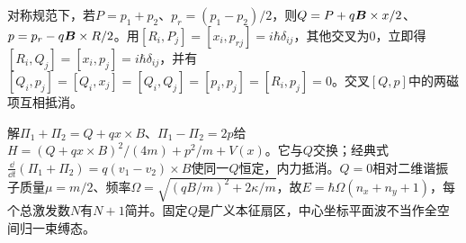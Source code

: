 \begin{solution}
对称规范下，若$P=p_1+p_2$、$p_r=(p_1-p_2)/2$，则$Q=P+q\boldsymbol{B}\times x/2$、$p=p_r-q\boldsymbol{B}\times R/2$。用$[R_i,P_j]=[x_i,p_{rj}]=i\hbar\delta_{ij}$，其他交叉为0，立即得$[R_i,Q_j]=[x_i,p_j]=i\hbar\delta_{ij}$，并有$[Q_i,p_j]=[Q_i,x_j]=[Q_i,Q_j]=[p_i,p_j]=[R_i,p_j]=0$。交叉$[Q,p]$中的两磁项互相抵消。

解$\Pi_1+\Pi_2=Q+q x\times B$、$\Pi_1-\Pi_2=2p$给$H=(Q+qx\times B)^2/(4m)+p^2/m+V(x)$。它与$Q$交换；经典式$\frac{\dd}{\dd t}(\Pi_1+\Pi_2)=q(v_1-v_2)\times B$使同一$Q$恒定，内力抵消。$Q=0$相对二维谐振子质量$\mu=m/2$、频率$\Omega=\sqrt{(qB/m)^2+2\kappa/m}$，故$E=\hbar\Omega(n_x+n_y+1)$，每个总激发数$N$有$N+1$简并。固定$Q$是广义本征扇区，中心坐标平面波不当作全空间归一束缚态。
\end{solution}

